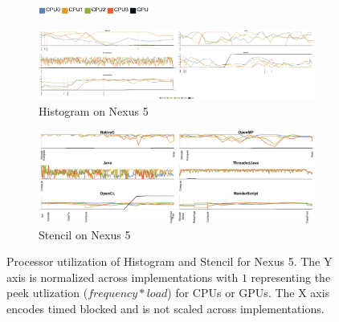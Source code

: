 \begin{figure}[ht]
  \centering

  \begin{subfigure}[b]{\textwidth}
          \centering
          \includegraphics[width=0.4\textwidth]{data/load_legend.pdf}
  \end{subfigure}

  \begin{subfigure}[b]{0.9\textwidth}
      \centering
      \includegraphics[width=\textwidth]{data/load_histogram_nexus5.pdf}
      \caption{Histogram on Nexus 5}
      \label{fig:Histogram5}
  \end{subfigure}
  \begin{subfigure}[b]{0.9\textwidth}
      \centering
      \includegraphics[width=\textwidth]{data/load_stencil_nexus5.pdf}
      \caption{Stencil on Nexus 5}
      \label{fig:Stencil5}
  \end{subfigure}

  \caption{Processor utilization of Histogram and Stencil for Nexus 5. The Y axis is normalized across implementations with $1$ representing the peek utlization ($frequency*load$) for CPUs or GPUs. The X axis encodes timed blocked and is not scaled across implementations.}
  \label{fig:loadHistogramStencil}
\end{figure}
\FloatBarrier
